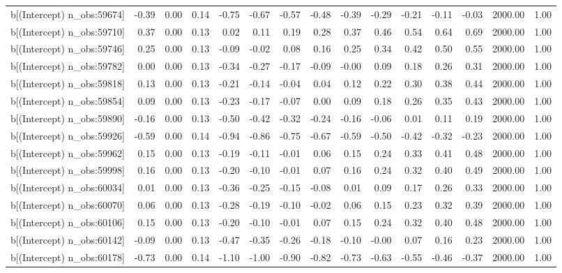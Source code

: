 \begin{table}[ht]
\begin{tabular}{rrrrrrrrrrrrrrr}
  b[(Intercept) n\_obs:59674] & -0.39 & 0.00 & 0.14 & -0.75 & -0.67 & -0.57 & -0.48 & -0.39 & -0.29 & -0.21 & -0.11 & -0.03 & 2000.00 & 1.00 \\ 
  b[(Intercept) n\_obs:59710] & 0.37 & 0.00 & 0.13 & 0.02 & 0.11 & 0.19 & 0.28 & 0.37 & 0.46 & 0.54 & 0.64 & 0.69 & 2000.00 & 1.00 \\ 
  b[(Intercept) n\_obs:59746] & 0.25 & 0.00 & 0.13 & -0.09 & -0.02 & 0.08 & 0.16 & 0.25 & 0.34 & 0.42 & 0.50 & 0.55 & 2000.00 & 1.00 \\ 
  b[(Intercept) n\_obs:59782] & 0.00 & 0.00 & 0.13 & -0.34 & -0.27 & -0.17 & -0.09 & -0.00 & 0.09 & 0.18 & 0.26 & 0.31 & 2000.00 & 1.00 \\ 
  b[(Intercept) n\_obs:59818] & 0.13 & 0.00 & 0.13 & -0.21 & -0.14 & -0.04 & 0.04 & 0.12 & 0.22 & 0.30 & 0.38 & 0.44 & 2000.00 & 1.00 \\ 
  b[(Intercept) n\_obs:59854] & 0.09 & 0.00 & 0.13 & -0.23 & -0.17 & -0.07 & 0.00 & 0.09 & 0.18 & 0.26 & 0.35 & 0.43 & 2000.00 & 1.00 \\ 
  b[(Intercept) n\_obs:59890] & -0.16 & 0.00 & 0.13 & -0.50 & -0.42 & -0.32 & -0.24 & -0.16 & -0.06 & 0.01 & 0.11 & 0.19 & 2000.00 & 1.00 \\ 
  b[(Intercept) n\_obs:59926] & -0.59 & 0.00 & 0.14 & -0.94 & -0.86 & -0.75 & -0.67 & -0.59 & -0.50 & -0.42 & -0.32 & -0.23 & 2000.00 & 1.00 \\ 
  b[(Intercept) n\_obs:59962] & 0.15 & 0.00 & 0.13 & -0.19 & -0.11 & -0.01 & 0.06 & 0.15 & 0.24 & 0.33 & 0.41 & 0.48 & 2000.00 & 1.00 \\ 
  b[(Intercept) n\_obs:59998] & 0.16 & 0.00 & 0.13 & -0.20 & -0.10 & -0.01 & 0.07 & 0.16 & 0.24 & 0.32 & 0.40 & 0.49 & 2000.00 & 1.00 \\ 
  b[(Intercept) n\_obs:60034] & 0.01 & 0.00 & 0.13 & -0.36 & -0.25 & -0.15 & -0.08 & 0.01 & 0.09 & 0.17 & 0.26 & 0.33 & 2000.00 & 1.00 \\ 
  b[(Intercept) n\_obs:60070] & 0.06 & 0.00 & 0.13 & -0.28 & -0.19 & -0.10 & -0.02 & 0.06 & 0.15 & 0.23 & 0.32 & 0.39 & 2000.00 & 1.00 \\ 
  b[(Intercept) n\_obs:60106] & 0.15 & 0.00 & 0.13 & -0.20 & -0.10 & -0.01 & 0.07 & 0.15 & 0.24 & 0.32 & 0.40 & 0.48 & 2000.00 & 1.00 \\ 
  b[(Intercept) n\_obs:60142] & -0.09 & 0.00 & 0.13 & -0.47 & -0.35 & -0.26 & -0.18 & -0.10 & -0.00 & 0.07 & 0.16 & 0.23 & 2000.00 & 1.00 \\ 
  b[(Intercept) n\_obs:60178] & -0.73 & 0.00 & 0.14 & -1.10 & -1.00 & -0.90 & -0.82 & -0.73 & -0.63 & -0.55 & -0.46 & -0.37 & 2000.00 & 1.00 \\ 

\end{tabular}
\end{table}
